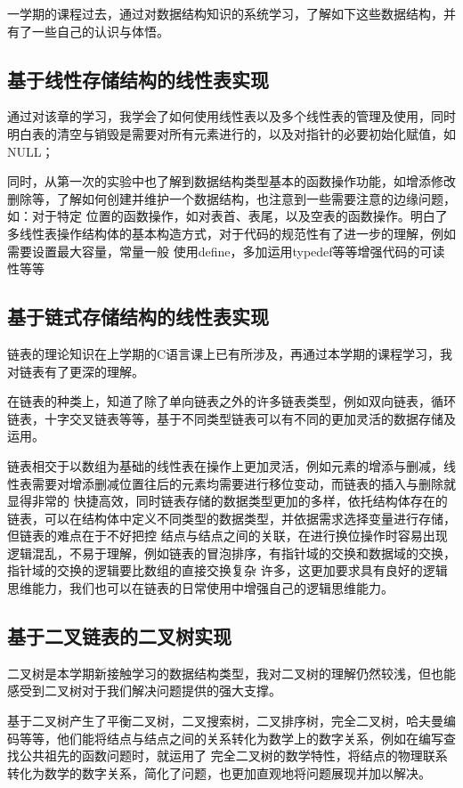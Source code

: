 \documentclass[supercite]{Experimental_Report}
\theoremstyle{definition}
\begin{document}
一学期的课程过去，通过对数据结构知识的系统学习，了解如下这些数据结构，并有了一些自己的认识与体悟。

\subsection{基于线性存储结构的线性表实现}
通过对该章的学习，我学会了如何使用线性表以及多个线性表的管理及使用，同时明白表的清空与销毁是需要对所有元素进行的，以及对指针的必要初始化赋值，如NULL；

同时，从第一次的实验中也了解到数据结构类型基本的函数操作功能，如增添修改删除等，了解如何创建并维护一个数据结构，也注意到一些需要注意的边缘问题，如：对于特定
位置的函数操作，如对表首、表尾，以及空表的函数操作。明白了多线性表操作结构体的基本构造方式，对于代码的规范性有了进一步的理解，例如需要设置最大容量，常量一般
使用define，多加运用typedef等等增强代码的可读性等等
\subsection{基于链式存储结构的线性表实现}
链表的理论知识在上学期的C语言课上已有所涉及，再通过本学期的课程学习，我对链表有了更深的理解。

在链表的种类上，知道了除了单向链表之外的许多链表类型，例如双向链表，循环链表，十字交叉链表等等，基于不同类型链表可以有不同的更加灵活的数据存储及运用。

链表相交于以数组为基础的线性表在操作上更加灵活，例如元素的增添与删减，线性表需要对增添删减位置往后的元素均需要进行移位变动，而链表的插入与删除就显得非常的
快捷高效，同时链表存储的数据类型更加的多样，依托结构体存在的链表，可以在结构体中定义不同类型的数据类型，并依据需求选择变量进行存储，但链表的难点在于不好把控
结点与结点之间的关联，在进行换位操作时容易出现逻辑混乱，不易于理解，例如链表的冒泡排序，有指针域的交换和数据域的交换，指针域的交换的逻辑要比数组的直接交换复杂
许多，这更加要求具有良好的逻辑思维能力，我们也可以在链表的日常使用中增强自己的逻辑思维能力。

\subsection{基于二叉链表的二叉树实现}
二叉树是本学期新接触学习的数据结构类型，我对二叉树的理解仍然较浅，但也能感受到二叉树对于我们解决问题提供的强大支撑。

基于二叉树产生了平衡二叉树，二叉搜索树，二叉排序树，完全二叉树，哈夫曼编码等等，他们能将结点与结点之间的关系转化为数学上的数字关系，例如在编写查找公共祖先的函数问题时，就运用了
完全二叉树的数学特性，将结点的物理联系转化为数学的数字关系，简化了问题，也更加直观地将问题展现并加以解决。
\end{document}
